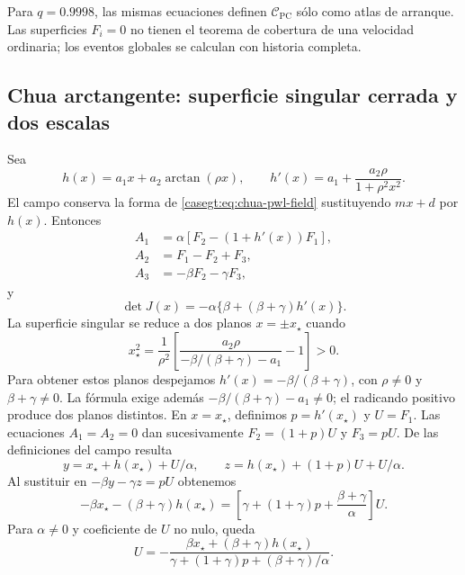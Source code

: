 Para $q=0.9998$, las mismas ecuaciones definen
$\mathcal C_{\mathrm{PC}}$ sólo como atlas de arranque. Las superficies
$F_i=0$ no tienen el teorema de cobertura de una velocidad ordinaria; los
eventos globales se calculan con historia completa.

\subsection{Chua arctangente: superficie singular cerrada y dos escalas}
\label{subsec:casegt-chua-arctan}

Sea
\begin{equation}
 h(x)=a_1x+a_2\arctan(\rho x),
 \qquad
 h'(x)=a_1+\frac{a_2\rho}{1+\rho^2x^2}.
 \label{casegt:eq:arctan-h}
\end{equation}
El campo conserva la forma de \eqref{casegt:eq:chua-pwl-field} sustituyendo
$mx+d$ por $h(x)$. Entonces
\begin{align}
 A_1&=\alpha[F_2-(1+h'(x))F_1],\nonumber\\
 A_2&=F_1-F_2+F_3,\\
 A_3&=-\beta F_2-\gamma F_3,
 \label{casegt:eq:arctan-A}
\end{align}
y
\begin{equation}
 \det J(x)=-\alpha\{\beta+(\beta+\gamma)h'(x)\}.
 \label{casegt:eq:arctan-det}
\end{equation}
La superficie singular se reduce a dos planos $x=\pm x_\star$ cuando
\begin{equation}
 x_\star^2=\frac{1}{\rho^2}
 \left[
 \frac{a_2\rho}{-\beta/(\beta+\gamma)-a_1}-1
 \right]>0.
 \label{casegt:eq:arctan-xstar}
\end{equation}
Para obtener estos planos despejamos
$h'(x)=-\beta/(\beta+\gamma)$, con $\rho\ne0$ y
$\beta+\gamma\ne0$. La fórmula exige además
$-\beta/(\beta+\gamma)-a_1\ne0$; el radicando positivo produce dos planos
distintos. En $x=x_\star$, definimos $p=h'(x_\star)$ y $U=F_1$.
Las ecuaciones $A_1=A_2=0$ dan sucesivamente
$F_2=(1+p)U$ y $F_3=pU$. De las definiciones del campo resulta
\[
 y=x_\star+h(x_\star)+U/\alpha,\qquad
 z=h(x_\star)+(1+p)U+U/\alpha.
\]
Al sustituir en $-\beta y-\gamma z=pU$ obtenemos
\[
 -\beta x_\star-(\beta+\gamma)h(x_\star)
 =\left[\gamma+(1+\gamma)p+\frac{\beta+\gamma}{\alpha}\right]U.
\]
Para $\alpha\ne0$ y coeficiente de $U$ no nulo, queda
\begin{equation}
 U=-\frac{\beta x_\star+(\beta+\gamma)h(x_\star)}
 {\gamma+(1+\gamma)p+(\beta+\gamma)/\alpha}.
 \label{casegt:eq:arctan-U}
\end{equation}
